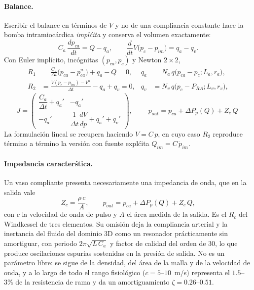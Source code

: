 \documentclass[11pt]{article}
\begin{document}
\paragraph{Balance.} Escribir el balance en t\'erminos de $V$ y no de una
compliancia constante hace la bomba intramioc\'ardica \emph{impl\'cita} y
conserva el volumen exactamente:
\begin{equation}
  C_a\,\frac{dp_{ca}}{dt}=Q-q_a,
  \qquad
  \frac{d}{dt}V\bigl(p_c-p_{im}\bigr)=q_a-q_v .
  \label{eq:balance}
\end{equation}
Con Euler impl\'icito, inc\'ognitas $(p_{ca},p_c)$ y Newton $2\times2$,
\begin{align}
  R_1&=\frac{C_a}{\Delta t}\bigl(p_{ca}-p_{ca}^{n}\bigr)+q_a-Q=0,
  &q_a&=N_a\,q\bigl(p_{ca}-p_c;L_a,r_a\bigr),
  \label{eq:R1}\\
  R_2&=\frac{V(p_c-p_{im})-V^{n}}{\Delta t}-q_a+q_v=0,
  &q_v&=N_v\,q\bigl(p_c-P_{RA};L_v,r_v\bigr),
  \label{eq:R2}
\end{align}
\begin{equation}
  J=\begin{pmatrix}
    \dfrac{C_a}{\Delta t}+q_a' & -q_a'\\[6pt]
    -q_a' & \dfrac{1}{\Delta t}\dfrac{dV}{dp}+q_a'+q_v'
  \end{pmatrix},
  \qquad
  \boxed{\;p_{out}=p_{ca}+\Delta P_p(Q)+Z_c\,Q\;}
  \label{eq:jac}
\end{equation}
La formulaci\'on lineal se recupera haciendo $V=C\,p$, en cuyo caso
$R_2$ reproduce t\'ermino a t\'ermino la versi\'on con fuente expl\'cita
$Q_{im}=C\,\dot p_{im}$.

\paragraph{Impedancia caracter\'stica.} Un vaso compliante presenta
necesariamente una impedancia de onda, que en la salida vale
\begin{equation}
  Z_c=\frac{\rho\,c}{A},
  \qquad
  p_{out}=p_{ca}+\Delta P_p(Q)+Z_c\,Q ,
  \label{eq:zc}
\end{equation}
con $c$ la velocidad de onda de pulso y $A$ el \'area medida de la salida. Es el
$R_c$ del Windkessel de tres elementos. Su omisi\'on deja la compliancia
arterial y la inertancia del fluido del dominio 3D como un resonador
pr\'acticamente sin amortiguar, con periodo $2\pi\sqrt{L\,C_a}$ y factor de
calidad del orden de $30$, lo que produce oscilaciones espurias sostenidas en la
presi\'on de salida. No es un par\'ametro libre: se sigue de la densidad, del
\'area de la malla y de la velocidad de onda, y a lo largo de todo el rango
fisiol\'ogico ($c=5$--$10$~m/s) representa el $1.5$--$3\%$ de la resistencia de
rama y da un amortiguamiento $\zeta=0.26$--$0.51$.
\end{document}
